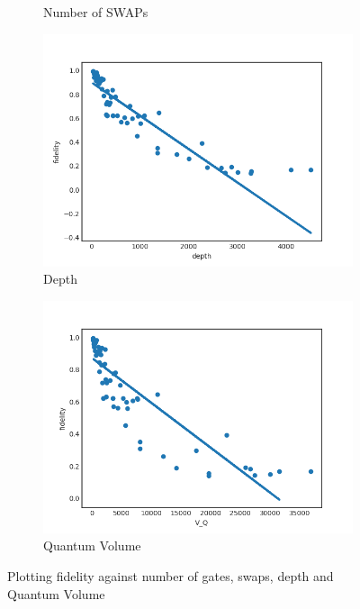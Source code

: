 \documentclass[11pt]{article}
\begin{document}
\begin{figure}[H]
\begin{subfigure}[b]{0.5\linewidth}
    \caption{Number of SWAPs} 
    \label{fig:f_s_3000_0} 
    \vspace{4ex}
  \end{subfigure} 
  \begin{subfigure}[b]{0.5\linewidth}
    \centering
    \includegraphics[width=0.75\linewidth]{f_d_3000_0} 
    \caption{Depth} 
    \label{fig:f_d_3000_0} 
  \end{subfigure}%
  \begin{subfigure}[b]{0.5\linewidth}
    \centering
    \includegraphics[width=0.75\linewidth]{f_q_3000_0} 
    \caption{Quantum Volume} 
    \label{fig:f_q_3000_0} 
  \end{subfigure} 
  \caption{Plotting fidelity against number of gates, swaps, depth and Quantum Volume}
  \label{fig:f_3000_0} 
\end{figure}
\end{document}
